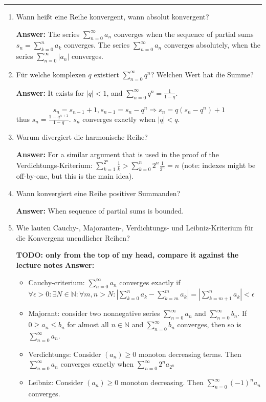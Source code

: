 \documentclass[11pt]{article}
\newcommand{\abs}[1]{\left|#1\right|}
\newcommand{\sumn}[4]{\sum_{#1=#2}^{#3}{#4}}
\begin{document}
\Large




\medskip\hrule
\begin{enumerate}
    \item Wann heißt eine Reihe konvergent, wann absolut konvergent?
    
    \textbf{Answer:} The series $\sumn{n}{0}{\infty}{a_n}$ converges when the sequence of partial sums $s_n = \sumn{k}{0}{n}{a_k}$ converges. The series $\sumn{n}{0}{\infty}{a_n}$ converges absolutely, when the series $\sumn{n}{0}{\infty}{\abs{a_n}}$ converges.

    \item  Für welche komplexen $q$ existiert $\sum_{n=0}^\infty {q^n}$? Welchen Wert hat die Summe?
    
    \textbf{Answer:} It exists for $\abs{q} < 1$, and $\sum_{n=0}^\infty {q^n} = \frac{1}{1-q}$. 
    
    $$s_n = s_{n-1} + 1, s_{n-1} = s_n - q^n \Rightarrow s_n = q(s_n - q^n)+1$$
    thus $s_n = \frac{1-q^{n+1}}{1-q}$. $s_n$ converges exactly when $\abs{q} < q$.

    \item  Warum divergiert die harmonische Reihe?
    
    \textbf{Answer:} For a similar argument that is used in the proof of the Verdichtungs-Kriterium: $\sumn{k}{1}{2^n}{\frac{1}{k}} > \sumn{k}{0}{n}{2^n \frac{1}{2^n}} = n$ (note: indexes might be off-by-one, but this is the main idea).

    \item  Wann konvergiert eine Reihe positiver Summanden?
    
    \textbf{Answer:} When sequence of partial sums is bounded.

    \item  Wie lauten Cauchy-, Majoranten-, Verdichtungs- und Leibniz-Kriterium für die Konvergenz unendlicher Reihen?
    
    \textbf{TODO: only from the top of my head, compare it against the lecture notes}
    \textbf{Answer:} \begin{itemize}
        \item Cauchy-criterium: $\sumn{n}{0}{\infty}{a_n}$ converges exactly if $\forall \epsilon > 0\colon  \exists N \in \mathbb{N}\colon \forall m,n > N\colon \abs{\sumn{k}{0}{n}{a_k} - \sumn{k}{m}{m}{a_k}} = \abs{\sumn{k}{m+1}{n}{a_k}} < \epsilon$
        \item Majorant: consider two nonnegative series $\sumn{n}{0}{\infty}{a_n}$ and $\sumn{n}{0}{\infty}{b_n}$. If $0 \ge a_n \le b_n$ for almost all $n\in \mathbb{N}$ and $\sumn{n}{0}{\infty}{b_n}$ converges, then so is $\sumn{n}{0}{\infty}{a_n}$.
        \item Verdichtungs: Consider $(a_n) \ge 0$ monoton decreasing terms. Then $\sumn{n}{0}{\infty}{a_n}$ converges exactly when $\sumn{n}{0}{\infty}{2^n a_{2^n}}$
        \item Leibniz: Consider $(a_n) \ge 0$ monoton decreasing. Then $\sumn{n}{0}{\infty}{(-1)^n a_n}$ converges.
    \end{itemize}


\end{enumerate}
\end{document}

